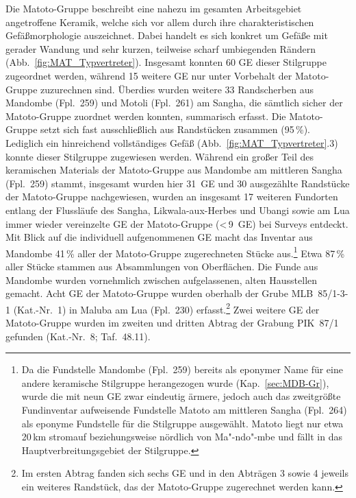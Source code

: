 Die Matoto-Gruppe beschreibt eine nahezu im gesamten Arbeitsgebiet angetroffene Keramik, welche sich vor allem durch ihre charakteristischen Gefäßmorphologie auszeichnet. Dabei handelt es sich konkret um Gefäße mit gerader Wandung und sehr kurzen, teilweise scharf umbiegenden Rändern (Abb.~\ref{fig:MAT_Typvertreter}). Insgesamt konnten 60 GE dieser Stilgruppe zugeordnet werden, während 15 weitere GE nur unter Vorbehalt der Matoto-Gruppe zuzurechnen sind. Überdies wurden weitere 33 Randscherben aus Mandombe (Fpl.~259) und Motoli (Fpl.~261) am \mbox{Sangha}, die sämtlich sicher der Matoto-Gruppe zuordnet werden konnten, summarisch erfasst. Die Matoto-Gruppe setzt sich fast ausschließlich aus Randstücken zusammen (95\,\%). Lediglich ein hinreichend vollständiges Gefäß (Abb.~\ref{fig:MAT_Typvertreter}.3) konnte dieser Stilgruppe zugewiesen werden. Während ein großer Teil des keramischen Materials der Matoto-Gruppe aus Mandombe am mittleren \mbox{Sangha} (Fpl.~259) stammt, insgesamt wurden hier 31~GE und 30 ausgezählte Randstücke der Matoto-Gruppe nachgewiesen, wurden an insgesamt 17 weiteren Fundorten entlang der Flussläufe des \mbox{Sangha}, \mbox{Likwala}-\mbox{aux}-\mbox{Herbes} und \mbox{Ubangi} sowie am Lua immer wieder vereinzelte GE der Matoto-Gruppe (\textless\,9~GE) bei Surveys entdeckt. Mit Blick auf die individuell aufgenommenen GE macht das Inventar aus Mandombe 41\,\% aller der Matoto-Gruppe zugerechneten Stücke aus.\footnote{Da die Fundstelle Mandombe (Fpl.~259) bereits als eponymer Name für eine andere keramische Stilgruppe herangezogen wurde (Kap.~\ref{sec:MDB-Gr}), wurde die mit neun GE zwar eindeutig ärmere, jedoch auch das zweitgrößte Fundinventar aufweisende Fundstelle Matoto am mittleren \mbox{Sangha} (Fpl.~264) als eponyme Fundstelle für die Stilgruppe ausgewählt. Matoto liegt nur etwa 20\,km stromauf beziehungsweise nördlich von Ma"-ndo"-mbe und fällt in das Hauptverbreitungsgebiet der Stilgruppe.} Etwa 87\,\% aller Stücke stammen aus Absammlungen von Oberflächen. Die Funde aus Mandombe wurden vornehmlich zwischen aufgelassenen, alten Hausstellen gemacht. Acht GE der Matoto-Gruppe wurden oberhalb der Grube MLB~85/1-3-1 (Kat.-Nr.~1) in Maluba am Lua (Fpl.~230) erfasst.\footnote{Im ersten Abtrag fanden sich sechs GE und in den Abträgen 3 sowie 4 jeweils ein weiteres Randstück, das der Matoto-Gruppe zugerechnet werden kann.} Zwei weitere GE der Matoto-Gruppe wurden im zweiten und dritten Abtrag der Grabung PIK~87/1 gefunden (Kat.-Nr.~8; Taf.~48.11).


